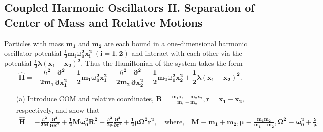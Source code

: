 \documentclass{article}
\begin{document}
{	\subsection*{Coupled Harmonic Oscillators II. Separation of Center of Mass and Relative Motions}
	Particles with mass $\bm{m_1}$ and $\bm{m_2}$ are each bound in a one-dimensional harmonic oscillator potential $\bm{\frac{1}{2} m_i \omega^2_0 x^2_i \; (i=1,2)}$ and interact with each other via the potential $\bm{\frac{1}{2} \lambda(x_1 - x_2)^2}$. Thus the Hamiltonian of the system takes the form
	\[
		\bm{\hat{H} = -\frac{\hbar^2}{2m_1} \frac{\partial^2}{\partial x_1^2} + \frac{1}{2} m_1 \omega^2_0 x_1^2 - \frac{\hbar^2}{2m_2} \frac{\partial^2}{\partial x_2^2} + \frac{1}{2} m_2 \omega^2_0 x_2^2 + \frac{1}{2} \lambda (x_1 - x_2)^2. }
	\]
	\begin{enumerate}
		\item[(a)] Introduce COM and relative coordinates, $\bm{R = \frac{m_1 x_1 + m_2 x_2}{m_1 + m_2}, r = x_1 - x_2,}$ respectively, and show that
		\begin{equation*}
			\begin{aligned}
				\bm{\hat{H} = -\frac{\hbar^2}{2M} \frac{\partial^2}{\partial R^2} + \frac{1}{2} M \omega^2_0 R^2 - \frac{\hbar^2}{2\mu} \frac{\partial^2}{\partial r^2} + \frac{1}{2} \mu \Omega^2 r^2,}
				\quad \text{where,} \quad
				\bm{ M \equiv m_1 + m_2, \mu \equiv \frac{m_1 m_2}{m_1 + m_2}, \Omega^2 \equiv \omega_0^2 + \frac{\lambda}{\mu}. }
			\end{aligned}
		\end{equation*}

\end{enumerate}}
\end{document}
